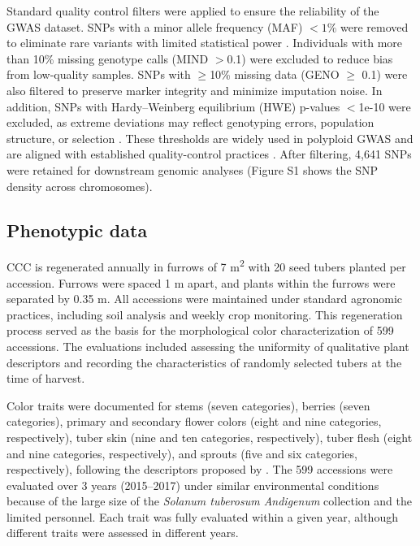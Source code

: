 \documentclass[pdflatex,sn-mathphys-ay]{sn-jnl}%
\begin{document}
Standard quality control filters were applied to ensure the reliability of the GWAS dataset. SNPs with a minor allele frequency (MAF) $<1\%$ were removed to eliminate rare variants with limited statistical power \citep{Anderson2010}. Individuals with more than 10\% missing genotype calls (MIND $>$0.1) were excluded to reduce bias from low-quality samples. SNPs with $\geq$10\% missing data (GENO $\geq$ 0.1) were also filtered to preserve marker integrity and minimize imputation noise. In addition, SNPs with Hardy–Weinberg equilibrium (HWE) p-values $<$1e-10 were excluded, as extreme deviations may reflect genotyping errors, population structure, or selection \citep{Wigginton2005}. These thresholds are widely used in polyploid GWAS and are aligned with established quality-control practices \citep{Lu2013, Pavan2020}. After filtering, 4,641 SNPs were retained for downstream genomic analyses (Figure S1 shows the SNP density across chromosomes).


\subsection{Phenotypic data }



CCC is regenerated annually in furrows of 7 m\textsuperscript{2} with 20 seed tubers planted per accession. Furrows were spaced 1 m apart, and plants within the furrows were separated by 0.35 m. All accessions were maintained under standard agronomic practices, including soil analysis and weekly crop monitoring. This regeneration process served as the basis for the morphological color characterization of 599 accessions. The evaluations included assessing the uniformity of qualitative plant descriptors and recording the characteristics of randomly selected tubers at the time of harvest.

Color traits were documented for stems (seven categories), berries (seven categories), primary and secondary flower colors (eight and nine categories, respectively), tuber skin (nine and ten categories, respectively), tuber flesh (eight and nine categories, respectively), and sprouts (five and six categories, respectively), following the descriptors proposed by \cite{gomez2000guia}. The 599 accessions were evaluated over 3 years (2015–2017) under similar environmental conditions because of the large size of the \textit{Solanum tuberosum Andigenum} collection and the limited personnel. Each trait was fully evaluated within a given year, although different traits were assessed in different years.
\end{document}
